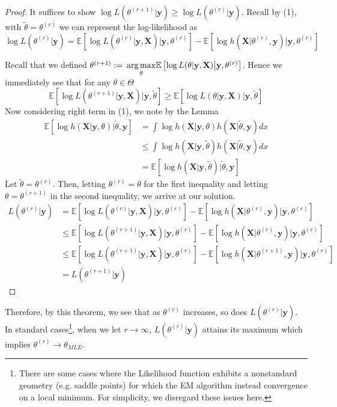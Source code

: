 \documentclass{article}
\newcommand{\E}{{\mathbb{E}}}
\begin{document}
\begin{proof}
It suffices to show $\log L(\theta^{(r+1)}|\mathbf{y})\geq \log L(\theta^{(r)}|\mathbf{y})$. Recall by (1), with $\tilde{\theta} = \theta^{(r)}$ we can represent the log-likelihood as $$\log L(\theta^{(r)}|\mathbf{y}) = \E\left[\log L(\theta^{(r)}|\mathbf{y},\mathbf{X})\big|\mathbf{y},\theta^{(r)}\right] - \E\left[\log h(\mathbf{X}|\theta^{(r)},\mathbf{y})\big| \mathbf{y},\theta^{(r)}\right]$$

Recall that we defined $\theta^{(r+1)}:=\hspace{.2em}\underset{\theta}{\arg\max}\E\left[\log L(\theta|\mathbf{y},\mathbf{X})\big|\mathbf{y},\theta^{(r)}\right]$. Hence we immediately see that for any $\theta\in\Theta$ $$\E\left[\log L(\theta^{(r+1)}|\mathbf{y},\mathbf{X})\big|\mathbf{y},\tilde{\theta}\right]\geq \E\left[\log L(\theta|\mathbf{y},\mathbf{X})\big|\mathbf{y},\tilde{\theta}\right]$$ 
Now considering right term in (1), we note by the Lemma 
\begin{align*}
\E\left[\log h(\mathbf{X}|\mathbf{y},\theta)\big|\tilde{\theta},\mathbf{y}\right] &= \int \log h(\mathbf{X}|\mathbf{y},\theta) h(\mathbf{X}|\tilde{\theta},\mathbf{y})dx\\
&\leq \int \log h(\mathbf{X}|\mathbf{y},\tilde{\theta}) h(\mathbf{X}|\tilde{\theta},\mathbf{y})dx\\
&= \E\left[\log h(\mathbf{X}|\mathbf{y},\tilde{\theta})\big|\tilde{\theta},\mathbf{y}\right]
\end{align*}
Let $\tilde{\theta} = \theta^{(r)}$. Then, letting $\theta^{(r)} = \theta$ for the first inequality and letting $\theta = \theta^{(r+1)}$ in the second inequality, we arrive at our solution. 
\begin{align*}
L(\theta^{(r)}|\mathbf{y}) &=  \E\left[\log L(\theta^{(r)}|\mathbf{y},\mathbf{X})\big|\mathbf{y},\theta^{(r)}\right] - \E\left[\log h(\mathbf{X}|\theta^{(r)},\mathbf{y})\big| \mathbf{y},\theta^{(r)}\right]\\
&\leq \E\left[\log L(\theta^{(r+1)}|\mathbf{y},\mathbf{X})\big|\mathbf{y},\theta^{(r)}\right] - \E\left[\log h(\mathbf{X}|\theta^{(r)},\mathbf{y})\big| \mathbf{y},\theta^{(r)}\right]\\
&\leq \E\left[\log L(\theta^{(r+1)}|\mathbf{y},\mathbf{X})\big|\mathbf{y},\theta^{(r)}\right] - \E\left[\log h(\mathbf{X}|\theta^{(r+1)},\mathbf{y})\big| \mathbf{y},\theta^{(r)}\right]\\
&= L(\theta^{(r+1)}|\mathbf{y})
\end{align*}
\end{proof}
Therefore, by this theorem, we see that as $\theta^{(r)}$ increases, so does $L(\theta^{(r)}|\mathbf{y})$. In standard cases\footnote{There are some cases where the Likelihood function exhibits a nonstandard geometry (e.g. saddle points) for which the EM algorithm instead convergence on a local minimum. For simplicity, we disregard these issues here.}, when we let $r\to\infty$, $L(\theta^{(r)}|\mathbf{y})$ attains its maximum which implies $\theta^{(r)}\to\theta_{MLE}$.  
\end{document}
